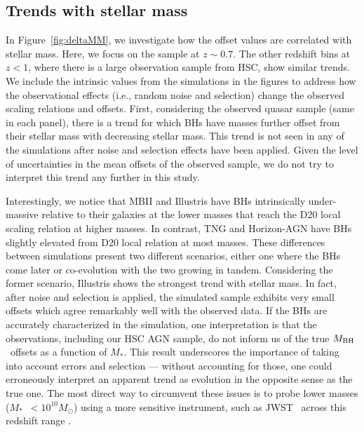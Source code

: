 \documentclass[twocolumn]{aastex631}
\def\smass{{$M_*$}}
\def\mbh{$M_{\rm BH}$}
\begin{document}
\subsection{Trends with stellar mass}
In Figure~\ref{fig:deltaMM}, we investigate how the offset values are correlated with stellar mass. Here, we focus on the sample at $z\sim0.7$. The other redshift bins at $z<1$, where there is a large observation sample from HSC, show similar trends. We include the intrinsic values from the simulations in the figures to address how the observational effects (i.e., random noise and selection) change the observed scaling relations and offsets. First, considering the observed quasar sample (same in each panel), there is a trend for which BHs have masses further offset from their stellar mass with decreasing stellar mass. This trend is not seen in any of the simulations after noise and selection effects have been applied. Given the level of uncertainties in the mean offsets of the observed sample, we do not try to interpret this trend any further in this study.

Interestingly, we notice that MBII and Illustris have BHs intrinsically under-massive relative to their galaxies at the lower masses that reach the D20 local scaling relation at higher masses. In contrast, TNG and Horizon-AGN have BHs slightly elevated from D20 local relation at most masses. These differences between simulations present two different scenarios, either one where the BHs come later or co-evolution with the two growing in tandem. Considering the former scenario, Illustris shows the strongest trend with stellar mass. In fact, after noise and selection is applied, the simulated sample exhibits very small offsets which agree remarkably well with the observed data. If the BHs are accurately characterized in the simulation, one interpretation is that the observations, including our HSC AGN sample, do not inform us of the true \mbh\ offsets as a function of \smass.  This result underscores the importance of taking into account errors and selection --- without accounting for those, one could erroneously interpret an apparent trend as evolution in the opposite sense as the true one. The most direct way to circumvent these issues is to probe lower masses (\smass\  $<10^{10}M_{\odot}$) using a more sensitive instrument, such as JWST~\citep{Habouzit2022} across this redshift range \citep[see also][]{2011MNRAS.417.2085V}.
\end{document}
